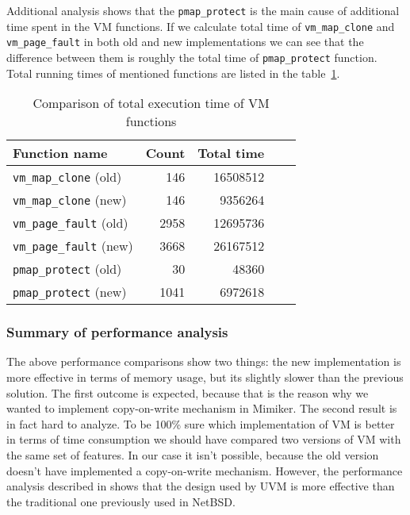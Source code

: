 Additional analysis shows that the \texttt{pmap_protect} is the main cause of additional time spent in the VM functions.
If we calculate total time of \texttt{vm_map_clone} and \texttt{vm_page_fault} in both old and new implementations we can see that
the difference between them is roughly the total time of \texttt{pmap_protect} function.
Total running times of mentioned functions are listed in the table~\ref{table:fn_times}.

\begin{table}[h]
  \centering
  \begin{tabular}{ |l|r|r|r|r| }
   \hline
    Function name & Count & Total time \\
   \hline
   \hline
    \texttt{vm_map_clone} (old) & 146 & 16508512 \\
    \texttt{vm_map_clone} (new) & 146 &  9356264 \\
   \hline
   \hline
    \texttt{vm_page_fault} (old) & 2958 & 12695736 \\
    \texttt{vm_page_fault} (new) & 3668 & 26167512 \\
   \hline
   \hline
    \texttt{pmap_protect} (old) &   30 &   48360 \\
    \texttt{pmap_protect} (new) & 1041 & 6972618 \\
   \hline
  \end{tabular}
  \caption{Comparison of total execution time of VM functions}
  \label{table:fn_times}
\end{table}

\subsubsection{Summary of performance analysis}

The above performance comparisons show two things: the new implementation is more effective in terms of memory usage,
but its slightly slower than the previous solution.
The first outcome is expected, because that is the reason why we wanted to implement copy-on-write mechanism in Mimiker.
The second result is in fact hard to analyze.
To be 100\% sure which implementation of VM is better in terms of time consumption we should have compared two versions of VM with the same set of features.
In our case it isn't possible, because the old version doesn't have implemented a copy-on-write mechanism.
However, the performance analysis described in \cite{cranor} shows that the design used by UVM is more effective than the traditional one previously used in NetBSD.

